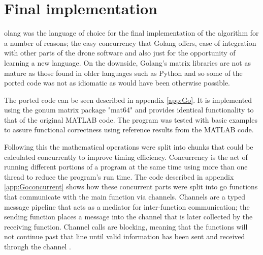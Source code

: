 \let\textcircled=\pgftextcircled
\chapter{Final implementation}
\label{chap:finalimplementation}


olang was the language of choice for the final implementation of the algorithm for a number of reasons; the easy concurrency that Golang offers, ease of integration with other parts of the drone software and also just for the opportunity of learning a new language. On the downside, Golang's matrix libraries are not as mature as those found in older languages such as Python and so some of the ported code was not as idiomatic as would have been otherwise possible. \par
	The ported code can be seen described in appendix \ref{app:Go}. It is implemented using the gonum matrix package "mat64" and provides identical functionality to that of the original MATLAB code. The program was tested with basic examples to assure functional correctness using reference results from the MATLAB code.\par
    Following this the mathematical operations were split into chunks that could be calculated concurrently to improve timing efficiency. Concurrency is the act of running different portions of a program at the same time using more than one thread to reduce the program's run time. The code described in appendix \ref{app:Goconcurrent} shows how these concurrent parts were split into go functions that communicate with the main function via channels. Channels are a typed message pipeline that acts as a mediator for inter-function communication; the sending function places a message into the channel that is later collected by the receiving function. Channel calls are blocking, meaning that the functions will not continue past that line until valid information has been sent and received through the channel \cite{go2017tour}.